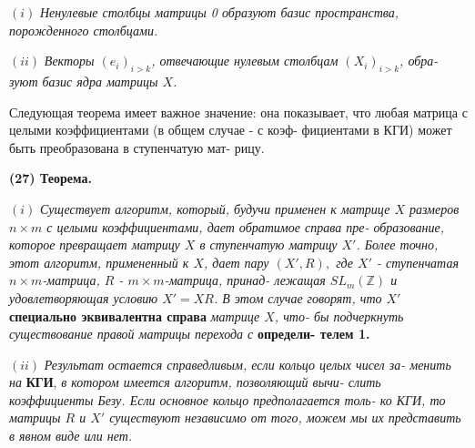 \documentclass{mai_book}
\begin{document}
	$(i)$ {\it Ненулевые столбцы матрицы 0 образуют базис пространства,\linebreak
	порожденного столбцами.}

	$(ii)$ {\it Векторы $(e_{i})_{i > k}$, отвечающие нулевым столбцам $(X_{i})_{i > k}$, обра-\linebreak
	зуют базис ядра матрицы $X$.}
	
	Следующая теорема имеет важное значение: она показывает, что\linebreak
	любая матрица с целыми коэффициентами (в общем случае - с коэф-\linebreak
	фициентами в КГИ) может быть преобразована в ступенчатую мат-\linebreak
	рицу.
	
	\pagebreak
	
	
	{\bf (27) Теорема.}
	
	$(i)$ {\it Существует алгоритм, который, будучи применен к матрице $X$\linebreak
	размеров $n\times m$ с целыми коэффициентами, дает обратимое справа пре-\linebreak
	образование, которое превращает матрицу $X$ в ступенчатую матрицу\linebreak
	$X'$. Более точно, этот алгоритм, примененный к $X$, дает пару $(X', R),$\linebreak
	где $X'$ - ступенчатая $n\times m$-матрица, $R$ - $m\times m$-матрица, принад-\linebreak
	лежащая $SL_{m}(\mathbb Z)$ и удовлетворяющая условию $X' = XR$. В этом случае\linebreak
	говорят, что $X'$} {\bf специально эквивалентна справа} {\it матрице $X$, \it что-\linebreak
	бы подчеркнуть существование правой матрицы перехода с} {\bf определи-\linebreak
	телем 1.}
	
	$(ii)$ {\it Результат остается справедливым, если кольцо целых чисел за-\linebreak
	менить на} {\bf КГИ}, {\it в котором имеется алгоритм, позволяющий вычи-\linebreak
	слить коэффициенты Безу. Если основное кольцо предполагается толь-\linebreak
	ко КГИ, то матрицы $R$ и $X'$ существуют независимо от того, можем\linebreak
	мы их представить в явном виде или нет.}
	
\end{document}

